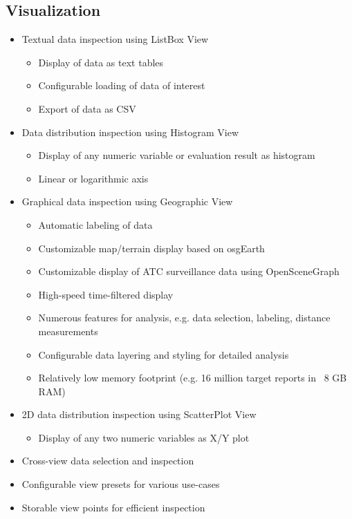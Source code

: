 \subsection{Visualization}
\begin{itemize}  
    \item Textual data inspection using ListBox View
    \begin{itemize}  
        \item Display of data as text tables
        \item Configurable loading of data of interest
        \item Export of data as CSV
    \end{itemize}
    \item Data distribution inspection using Histogram View
    \begin{itemize}  
        \item Display of any numeric variable or evaluation result as histogram
        \item Linear or logarithmic axis
    \end{itemize}
    \item Graphical data inspection using Geographic View
    \begin{itemize}  
        \item Automatic labeling of data
        \item Customizable map/terrain display based on osgEarth
        \item Customizable display of ATC surveillance data using OpenSceneGraph
        \item High-speed time-filtered display
        \item Numerous features for analysis, e.g. data selection, labeling, distance measurements
        \item Configurable data layering and styling for detailed analysis
        \item Relatively low memory footprint (e.g. 16 million target reports in ~8 GB RAM)
    \end{itemize}    
    \item 2D data distribution inspection using ScatterPlot View
    \begin{itemize}  
        \item Display of any two numeric variables as X/Y plot
    \end{itemize}
    \item Cross-view data selection and inspection
    \item Configurable view presets for various use-cases
    \item Storable view points for efficient inspection
\end{itemize}


